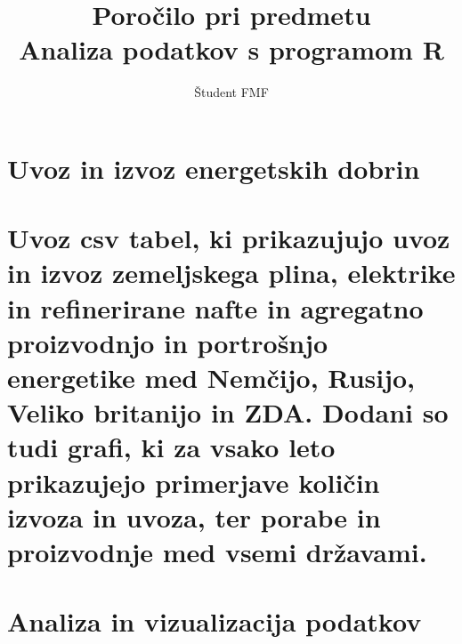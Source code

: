\documentclass[11pt,a4paper]{article}
\begin{document}
\title{Poročilo pri predmetu \\
Analiza podatkov s programom R}
\author{Študent FMF}
\maketitle

\section{Uvoz in izvoz energetskih dobrin}

\section{Uvoz csv tabel, ki prikazujujo uvoz in izvoz zemeljskega plina, elektrike in refinerirane nafte in agregatno proizvodnjo in portrošnjo energetike med Nemčijo, Rusijo, Veliko britanijo in ZDA. Dodani so tudi grafi, ki za vsako leto prikazujejo primerjave količin izvoza in uvoza, ter porabe in proizvodnje med vsemi državami.}

\section{Analiza in vizualizacija podatkov}
\end{document}
